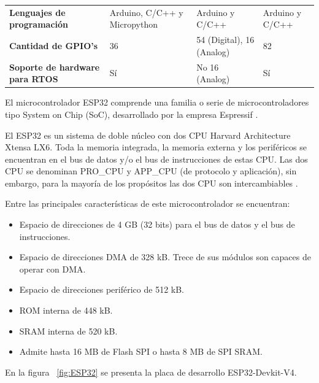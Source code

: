 \begin{table}[h]
\begin{tabular}{p{3cm} p{3cm} p{2.5cm} p{2.5cm} }
        \textbf{Lenguajes de programación} & Arduino, C/C++ y Micropython  & Arduino y C/C++               & Arduino y C/C++                  \\

        \textbf{Cantidad de GPIO's }       & 36            & 54 (Digital), 16 (Analog)           & 82                                  \\

        \textbf{Soporte de hardware para RTOS} & Sí        & No 16 (Analog)           & Sí                                 \\
    \bottomrule
    \hline
    \end{tabular}
    \label{tabla:comparativa}
\end{table}


El microcontrolador ESP32 comprende una familia o serie de microcontroladores tipo System on Chip (SoC), desarrollado por la empresa Espressif \citep{ESPRESSIF}. 

El ESP32 es un sistema de doble núcleo con dos CPU Harvard Architecture Xtensa LX6. Toda la memoria integrada, la memoria externa y los periféricos se encuentran en el bus de datos y/o el bus de instrucciones de estas CPU. Las dos CPU se denominan PRO\_CPU y APP\_CPU (de protocolo y aplicación), sin embargo, para la mayoría de los propósitos las dos CPU son intercambiables \citep{ESPRESSIF}.

Entre las principales características de este microcontrolador se encuentran:

\begin{itemize}
    \item Espacio de direcciones de 4 GB (32 bits) para el bus de datos y el bus de instrucciones. 
    \item Espacio de direcciones DMA de 328 kB. Trece de sus módulos son capaces de operar con DMA.
    \item Espacio de direcciones periférico de 512 kB.
    \item ROM interna de 448 kB.
    \item SRAM interna de 520 kB.
    \item Admite hasta 16 MB de Flash SPI o hasta 8 MB de SPI SRAM.    
\end{itemize}

En la figura ~\ref{fig:ESP32} se presenta la placa de desarrollo ESP32-Devkit-V4.

\vspace{1cm}

